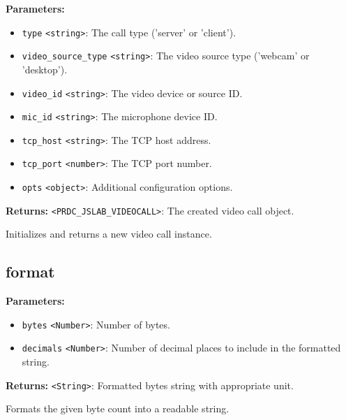 \documentclass[12pt,a4paper]{article}
\begin{document}
\noindent \textbf{Parameters:}
\begin{itemize}
  \item \texttt{type} \texttt{<string>}: The call type ('server' or 'client').
  \item \texttt{video\_source\_type} \texttt{<string>}: The video source type ('webcam' or 'desktop').
  \item \texttt{video\_id} \texttt{<string>}: The video device or source ID.
  \item \texttt{mic\_id} \texttt{<string>}: The microphone device ID.
  \item \texttt{tcp\_host} \texttt{<string>}: The TCP host address.
  \item \texttt{tcp\_port} \texttt{<number>}: The TCP port number.
  \item \texttt{opts} \texttt{<object>}: Additional configuration options.
\end{itemize}

\noindent \textbf{Returns:} \texttt{<PRDC\_JSLAB\_VIDEOCALL>}: The created video call object.

\noindent Initializes and returns a new video call instance.


\subsection{format}
\vspace{5mm}
\noindent {}


\noindent \textbf{Parameters:}
\begin{itemize}
  \item \texttt{bytes} \texttt{<Number>}: Number of bytes.
  \item \texttt{decimals} \texttt{<Number>}: Number of decimal places to include in the formatted string.
\end{itemize}

\noindent \textbf{Returns:} \texttt{<String>}: Formatted bytes string with appropriate unit.

\noindent Formats the given byte count into a readable string.

\vspace{5mm}
\noindent {}
\end{document}
